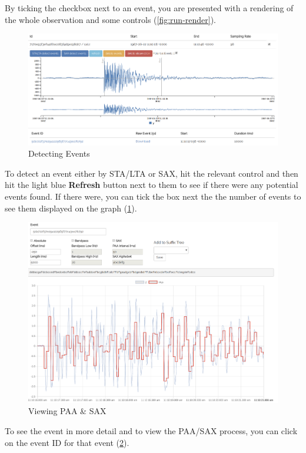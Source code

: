 \documentclass[../report.tex]{subfiles}
\begin{document}
	By ticking the checkbox next to an event, you are presented with a rendering of the whole observation and some controls (\cref{fig:run-render}).

\begin{figure}[H]
	\centering
	\includegraphics[width=1\linewidth]{img/run-detected}
	\caption{Detecting Events}
	\label{fig:run-detected}
\end{figure}

	To detect an event either by STA/LTA or SAX, hit the relevant control and then hit the light blue \textbf{Refresh} button next to them to see if there were any potential events found.  If there were, you can tick the box next the the number of events to see them displayed on the graph (\cref{fig:run-detected}).

\begin{figure}[H]
	\centering
	\includegraphics[width=1\linewidth]{img/run-event}
	\caption{Viewing PAA \& SAX}
	\label{fig:run-event}
\end{figure}

	To see the event in more detail and to view the PAA/SAX process, you can click on the event ID for that event (\cref{fig:run-event}).
\end{document}
